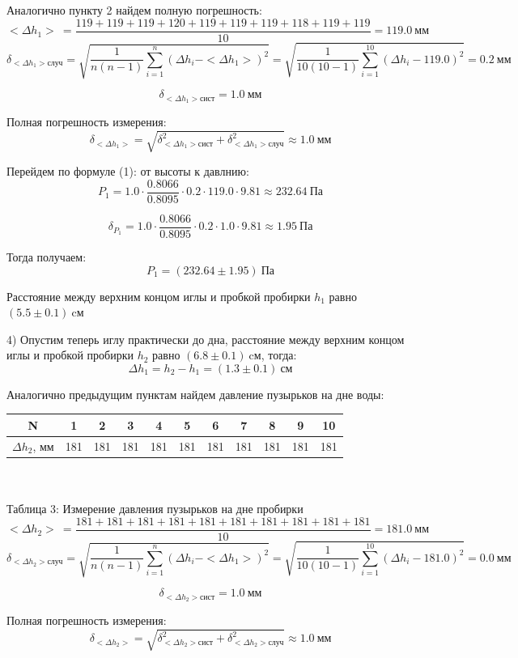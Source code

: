 \documentclass[a4paper,12pt]{article} %
\begin{document}
Аналогично пункту 2 найдем полную погрешность:
\[<\Delta h_1>\ = \frac{119+119+119+120+119+119+119+118+119+119}{10} = 119.0\ \text{мм}\]
\[\delta_{<\Delta h_1> \text{случ}} = \sqrt{\frac{1}{n(n-1)}\sum_{i=1}^n(\Delta h_i - <\Delta h_1>)^2} = \sqrt{\frac{1}{10(10-1)}\sum_{i=1}^{10}(\Delta h_i - 119.0)^2} = 0.2\ \text{мм}\]

\[\delta_{<\Delta h_1> \text{сист}} = 1.0\ \text{мм}\]

Полная погрешность измерения:
\[\delta_{<\Delta h_1>} = \sqrt{\delta_{<\Delta h_1> \text{сист}}^2 + 
							  \delta_{<\Delta h_1> \text{случ}}^2} \approx 1.0\ \text{мм}\]
							  
Перейдем по формуле (1): от высоты к давлнию:
\[P_1 = 1.0\cdot \frac{0.8066}{0.8095}\cdot 0.2\cdot 119.0\cdot 9.81\approx 232.64\ \text{Па}\]

\[\delta_{P_1} = 1.0\cdot \frac{0.8066}{0.8095}\cdot 0.2\cdot 1.0\cdot 9.81\approx 1.95\ \text{Па}\]

Тогда получаем:
\[P_1 = (232.64 \pm 1.95)\ \text{Па}\]

Расстояние между верхним концом иглы и пробкой пробирки $h_1$ равно $(5.5 \pm 0.1)\ \text{cм}$

4) Опустим теперь иглу практически до дна, расстояние между верхним концом иглы и пробкой пробирки $h_2$ равно $(6.8 \pm 0.1)\ \text{cм}$, тогда:
\[\Delta h_1 = h_2 - h_1 = (1.3 \pm 0.1)\ \text{см}\]

Аналогично предыдущим пунктам найдем давление пузырьков на дне воды:

\begin{tabular}{ | c | c | c | c | c | c |c | c | c | c | c | }
\hline
	N  & 1  & 2  & 3  & 4  & 5  & 6  & 7  & 8  & 9  & 10 \\ \hline
	$\Delta h_2$, мм & 181 & 181 & 181 & 181 & 181 & 181 & 181 & 181 & 181 & 181 \\ \hline
\end{tabular}\\
\setlength{\parskip}{0.3cm}\\
Таблица 3: Измерение давления пузырьков на дне пробирки
\[<\Delta h_2>\ = \frac{181+181+181+181+181+181+181+181+181+181}{10} = 181.0\ \text{мм}\]
\[\delta_{<\Delta h_2> \text{случ}} = \sqrt{\frac{1}{n(n-1)}\sum_{i=1}^n(\Delta h_i - <\Delta h_1>)^2} = \sqrt{\frac{1}{10(10-1)}\sum_{i=1}^{10}(\Delta h_i - 181.0)^2} = 0.0\ \text{мм}\]

\[\delta_{<\Delta h_2> \text{сист}} = 1.0\ \text{мм}\]

Полная погрешность измерения:
\[\delta_{<\Delta h_2>} = \sqrt{\delta_{<\Delta h_2> \text{сист}}^2 + 
							  \delta_{<\Delta h_2> \text{случ}}^2} \approx 1.0\ \text{мм}\]
							  
\end{document}

